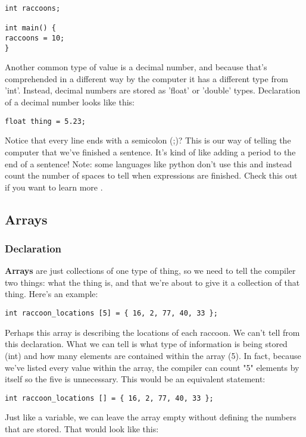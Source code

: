 \documentclass[a4paper]{article}
\begin{document}
\begin{verbatim}
int raccoons;

int main() {
raccoons = 10;
}
\end{verbatim}

Another common type of value is a decimal number, and because that's comprehended in a different way by the computer it has a different type from 'int'. Instead, decimal numbers are stored as 'float' or 'double' types. Declaration of a decimal number looks like this:

\begin{verbatim}
float thing = 5.23;
\end{verbatim}

Notice that every line ends with a semicolon (;)? This is our way of telling the computer that we've finished a sentence. It's kind of like adding a period to the end of a sentence! Note: some languages like python don't use this and instead count the number of spaces to tell when expressions are finished. Check this out if you want to learn more \cite{cpp_extra}.

\subsection{Arrays}
\subsubsection{Declaration}
\textbf{Arrays} are just collections of one type of thing, so we need to tell the compiler two things: what the thing is, and that we're about to give it a collection of that thing. Here's an example:

\begin{verbatim}
int raccoon_locations [5] = { 16, 2, 77, 40, 33 };
\end{verbatim}

Perhaps this array is describing the locations of each raccoon. We can't tell from this declaration. What we can tell is what type of information is being stored (int) and how many elements are contained within the array (5). In fact, because we've listed every value within the array, the compiler can count "5" elements by itself so the five is unnecessary. This would be an equivalent statement:

\begin{verbatim}
int raccoon_locations [] = { 16, 2, 77, 40, 33 };
\end{verbatim}

Just like a variable, we can leave the array empty without defining the numbers that are stored. That would look like this:
\end{document}
